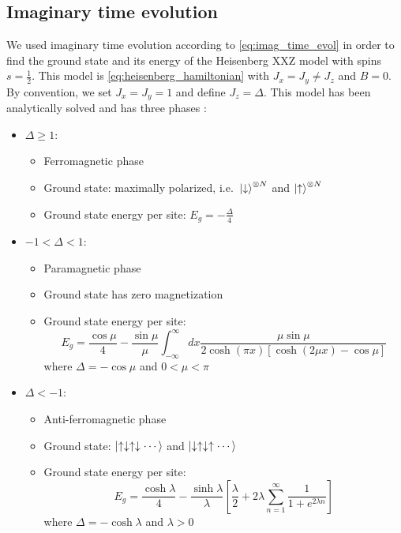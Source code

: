 \documentclass[a4paper, headsepline, footheight=13.6pt]{scrartcl}
\begin{document}
\subsection{Imaginary time evolution} \label{subsec:imag_time_evol}
We used imaginary time evolution according to \autoref{eq:imag_time_evol} in order to find the ground state and its energy of the Heisenberg XXZ model with spins $s=\frac12$. This model is \autoref{eq:heisenberg_hamiltonian} with $J_x = J_y \neq J_z$ and $B=0$. By convention, we set $J_x = J_y = 1$ and define $J_z = \Delta$. This model has been analytically solved and has three phases \cite{Franchini_2017, Yang:1966ab, Yang:1966aa}:
\begin{itemize}
    \item $\Delta \ge 1$:
    \begin{itemize}
        \item Ferromagnetic phase
        \item Ground state: maximally polarized, i.e.\ $\Ket{\downarrow}^{\otimes N}$ and $\Ket{\uparrow}^{\otimes N}$
        \item Ground state energy per site: $E_g = -\frac{\Delta}{4}$
    \end{itemize}
    \item $ -1 < \Delta < 1$:
    \begin{itemize}
        \item Paramagnetic phase
        \item Ground state has zero magnetization
        \item Ground state energy per site:
        \begin{equation}
            E_g = \frac{\cos\mu}{4} - \frac{\sin\mu}{\mu} \int_{-\infty}^{\infty} dx \frac{\mu \sin\mu}{2\cosh(\pi x)[\cosh(2\mu x) - \cos\mu]}
        \end{equation}
        where $\Delta = -\cos\mu$ and $0 < \mu < \pi$
    \end{itemize}
    \item $ \Delta < -1$:
    \begin{itemize}
        \item Anti-ferromagnetic phase
        \item Ground state: $\Ket{\uparrow\downarrow\uparrow\downarrow\cdots}$ and $\Ket{\downarrow\uparrow\downarrow\uparrow\cdots}$
        \item Ground state energy per site:
        \begin{equation}
            E_g = \frac{\cosh\lambda}{4}-\frac{\sinh\lambda}{\lambda}\left[\frac{\lambda}{2} + 2\lambda\sum_{n=1}^{\infty}\frac{1}{1+e^{2\lambda n}}\right]
        \end{equation}
        where $\Delta = -\cosh\lambda$ and $\lambda > 0$
    \end{itemize}
\end{itemize}
\end{document}
